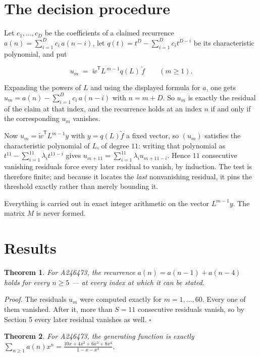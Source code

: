 \documentclass[11pt]{article}
\newtheorem{theorem}{Theorem}
\theoremstyle{definition}
\begin{document}
\section{The decision procedure}

Let $c_1,\dots,c_D$ be the coefficients of a claimed recurrence $a(n) = \sum_{i=1}^{D} c_i\,a(n-i)$, let $q(t) = t^{D} - \sum_{i=1}^{D} c_i t^{D-i}$ be its characteristic polynomial, and put

\[u_m \;=\; \tilde w^{\mathsf T} L^{\,m-1} q(L)\,\tilde f \qquad (m \ge 1).\]

Expanding the powers of $L$ and using the displayed formula for $a$, one gets $u_m = a(n) - \sum_{i=1}^{D} c_i\,a(n-i)$ with $n = m + D$. So $u_m$ is exactly the residual of the claim at that index, and the recurrence holds at an index $n$ if and only if the corresponding $u_m$ vanishes.

Now $u_m = \tilde w^{\mathsf T} L^{m-1} y$ with $y = q(L)\tilde f$ a fixed vector, so $(u_m)$ satisfies the characteristic polynomial of $L$, of degree $11$: writing that polynomial as $t^{11} - \sum_{i=1}^{11} \lambda_i t^{11-i}$ gives $u_{m+11} = \sum_{i=1}^{11} \lambda_i u_{m+11-i}$. Hence $11$ consecutive vanishing residuals force every later residual to vanish, by induction. The test is therefore finite; and because it locates the {\itshape last} nonvanishing residual, it pins the threshold exactly rather than merely bounding it.

Everything is carried out in exact integer arithmetic on the vector $L^{m-1}y$. The matrix $M$ is never formed.

\section{Results}

\begin{theorem} For A246473, the recurrence $a(n) = a(n-1) + a(n-4)$ holds for every $n \ge 5$ --- at every index at which it can be stated.\end{theorem}

{\itshape Proof.} The residuals $u_m$ were computed exactly for $m = 1,\dots,60$. Every one of them vanished. After it, more than $S = 11$ consecutive residuals vanish, so by Section 5 every later residual vanishes as well. $\square$

\begin{theorem} For A246473, the generating function is exactly $\sum_{n\ge 1} a(n)x^n = \frac{10x + 4x^{2} + 6x^{3} + 8x^{4}}{1 - x - x^{4}}$.\end{theorem}
\end{document}
